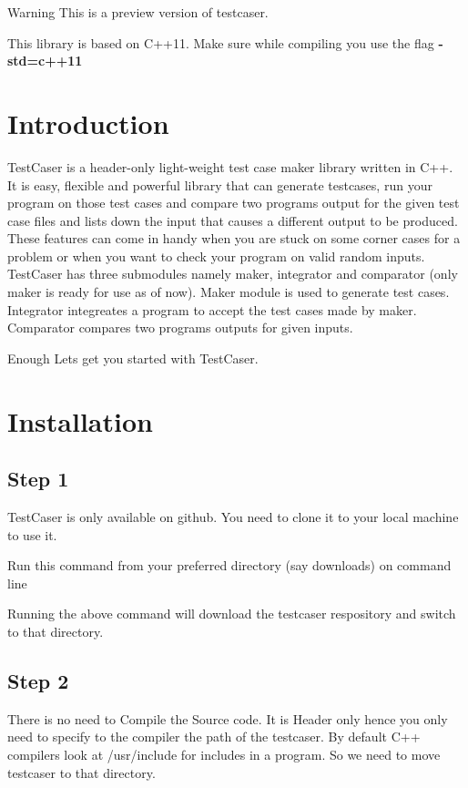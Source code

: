 \begin{DoxyWarning}{Warning}
This is a preview version of testcaser.

This library is based on C++11. Make sure while compiling you use the flag {\bfseries{-\/std=c++11}}
\end{DoxyWarning}
\hypertarget{index_sec_intro}{}\section{Introduction}\label{index_sec_intro}
Test\+Caser is a header-\/only light-\/weight test case maker library written in C++. It is easy, flexible and powerful library that can generate testcases, run your program on those test cases and compare two program\textquotesingle{}s output for the given test case files and lists down the input that causes a different output to be produced. These features can come in handy when you are stuck on some corner cases for a problem or when you want to check your program on valid random inputs. Test\+Caser has three submodules namely maker, integrator and comparator (only maker is ready for use as of now). Maker module is used to generate test cases. Integrator integreates a program to accept the test cases made by maker. Comparator compares two program\textquotesingle{}s outputs for given inputs.

Enough Let\textquotesingle{}s get you started with Test\+Caser.\hypertarget{index_sec_install}{}\section{Installation}\label{index_sec_install}
\hypertarget{index_step1}{}\subsection{Step 1}\label{index_step1}
Test\+Caser is only available on github. You need to clone it to your local machine to use it.

Run this command from your preferred directory (say downloads) on command line 
\begin{DoxyCode}{0}
\end{DoxyCode}
 Running the above command will download the testcaser respository and switch to that directory.\hypertarget{index_step2}{}\subsection{Step 2}\label{index_step2}
There is no need to Compile the Source code. It is Header only hence you only need to specify to the compiler the path of the testcaser. By default C++ compilers look at {\ttfamily /usr/include} for includes in a program. So we need to move testcaser to that directory.

